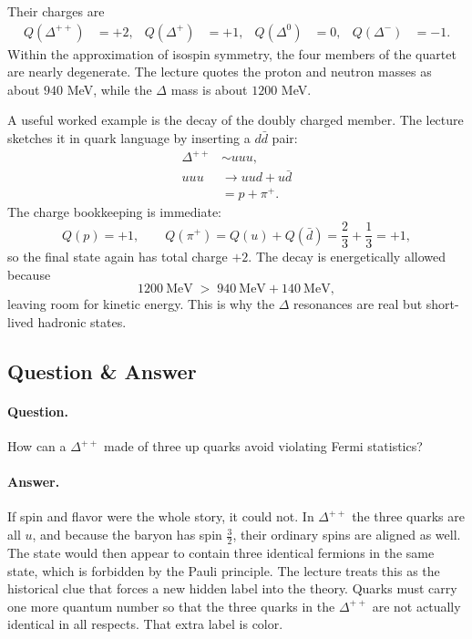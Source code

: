 Their charges are
\begin{align}
Q(\Delta^{++})&=+2, &
Q(\Delta^{+})&=+1, &
Q(\Delta^{0})&=0, &
Q(\Delta^{-})&=-1.
\end{align}
Within the approximation of isospin symmetry, the four members of the quartet are nearly degenerate. The lecture quotes the proton and neutron masses as about \(940\) MeV, while the \(\Delta\) mass is about \(1200\) MeV.

A useful worked example is the decay of the doubly charged member. The lecture sketches it in quark language by inserting a \(d\bar d\) pair:
\begin{align}
\Delta^{++} &\sim uuu, \\
uuu &\longrightarrow uud + u\bar d \\
&= p + \pi^+.
\end{align}
The charge bookkeeping is immediate:
\[
Q(p)=+1,
\qquad
Q(\pi^+)=Q(u)+Q(\bar d)=\frac23+\frac13=+1,
\]
so the final state again has total charge \(+2\). The decay is energetically allowed because
\[
1200\ \text{MeV} \; > \; 940\ \text{MeV} + 140\ \text{MeV},
\]
leaving room for kinetic energy. This is why the \(\Delta\) resonances are real but short-lived hadronic states.

\subsection{Question \& Answer}

\paragraph{Question.} How can a \(\Delta^{++}\) made of three up quarks avoid violating Fermi statistics?

\paragraph{Answer.} If spin and flavor were the whole story, it could not. In \(\Delta^{++}\) the three quarks are all \(u\), and because the baryon has spin \(\tfrac32\), their ordinary spins are aligned as well. The state would then appear to contain three identical fermions in the same state, which is forbidden by the Pauli principle. The lecture treats this as the historical clue that forces a new hidden label into the theory. Quarks must carry one more quantum number so that the three quarks in the \(\Delta^{++}\) are not actually identical in all respects. That extra label is color.

